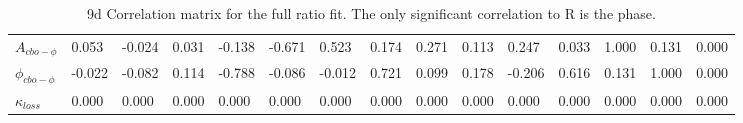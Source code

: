\begin{landscape}
\begin{table}[]
\begin{tabular*}{\linewidth}{@{\extracolsep{\fill}}lLBLLLLLLLLLLLL}
$A_{cbo-\phi}$     & 0.053 & -0.024 & 0.031 & -0.138 & -0.671 & 0.523 & 0.174 & 0.271 & 0.113 & 0.247 & 0.033 & 1.000 & 0.131 & 0.000  \\
$\phi_{cbo-\phi}$  & -0.022 & -0.082 & 0.114 & -0.788 & -0.086 & -0.012 & 0.721 & 0.099 & 0.178 & -0.206 & 0.616 & 0.131 & 1.000 & 0.000  \\
$\kappa_{loss}$    & 0.000 & 0.000 & 0.000 & 0.000 & 0.000 & 0.000 & 0.000 & 0.000 & 0.000 & 0.000 & 0.000 & 0.000 & 0.000 & 0.000  \\
  \bottomrule
\end{tabular*}
\caption[]{9d Correlation matrix for the full ratio fit. The only significant correlation to R is the \gmtwo phase.}
\label{Tab:CorrMat}
\end{table}
\end{landscape}

